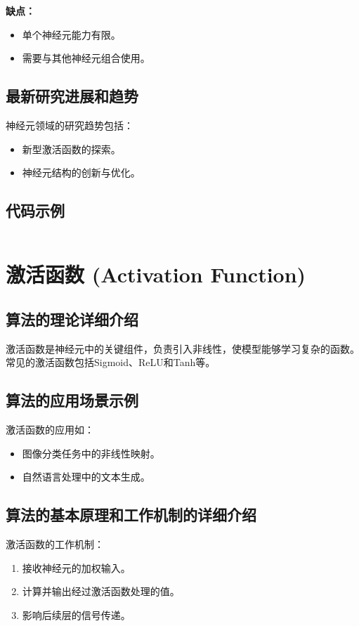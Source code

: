 \textbf{缺点：}
\begin{itemize}
    \item 单个神经元能力有限。
    \item 需要与其他神经元组合使用。
\end{itemize}

\subsection*{最新研究进展和趋势}
神经元领域的研究趋势包括：
\begin{itemize}
    \item 新型激活函数的探索。
    \item 神经元结构的创新与优化。
\end{itemize}
\subsection*{代码示例}
\begin{lstlisting}

\end{lstlisting}


\section{激活函数 (Activation Function)}
\subsection*{算法的理论详细介绍}
激活函数是神经元中的关键组件，负责引入非线性，使模型能够学习复杂的函数。常见的激活函数包括Sigmoid、ReLU和Tanh等。

\subsection*{算法的应用场景示例}
激活函数的应用如：
\begin{itemize}
    \item 图像分类任务中的非线性映射。
    \item 自然语言处理中的文本生成。
\end{itemize}

\subsection*{算法的基本原理和工作机制的详细介绍}
激活函数的工作机制：
\begin{enumerate}
    \item 接收神经元的加权输入。
    \item 计算并输出经过激活函数处理的值。
    \item 影响后续层的信号传递。
\end{enumerate}

